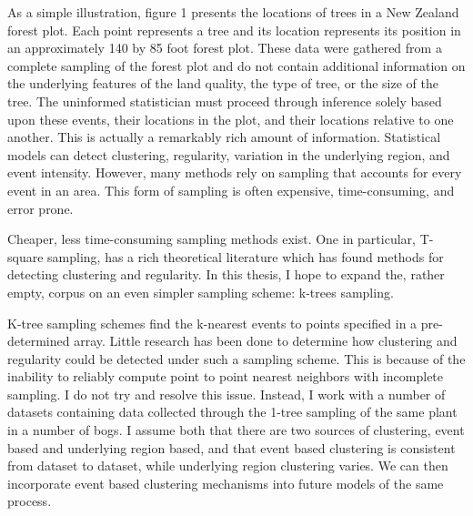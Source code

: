 \documentclass[12pt,twoside]{reedthesis}
\begin{document}
  As a simple illustration, figure 1 presents the locations of trees in a
  New Zealand forest plot. Each point represents a tree and its location
  represents its position in an approximately 140 by 85 foot forest plot.
  These data were gathered from a complete sampling of the forest plot and
  do not contain additional information on the underlying features of the
  land quality, the type of tree, or the size of the tree. The uninformed
  statistician must proceed through inference solely based upon these
  events, their locations in the plot, and their locations relative to one
  another. This is actually a remarkably rich amount of information.
  Statistical models can detect clustering, regularity, variation in the
  underlying region, and event intensity. However, many methods rely on
  sampling that accounts for every event in an area. This form of sampling
  is often expensive, time-consuming, and error prone.
  
  Cheaper, less time-consuming sampling methods exist. One in particular,
  T-square sampling, has a rich theoretical literature which has found
  methods for detecting clustering and regularity. In this thesis, I hope
  to expand the, rather empty, corpus on an even simpler sampling scheme:
  k-trees sampling.
  
  K-tree sampling schemes find the k-nearest events to points specified in
  a pre-determined array. Little research has been done to determine how
  clustering and regularity could be detected under such a sampling
  scheme. This is because of the inability to reliably compute point to
  point nearest neighbors with incomplete sampling. I do not try and
  resolve this issue. Instead, I work with a number of datasets containing
  data collected through the 1-tree sampling of the same plant in a number
  of bogs. I assume both that there are two sources of clustering, event
  based and underlying region based, and that event based clustering is
  consistent from dataset to dataset, while underlying region clustering
  varies. We can then incorporate event based clustering mechanisms into
  future models of the same process.\\
  
\end{document}
